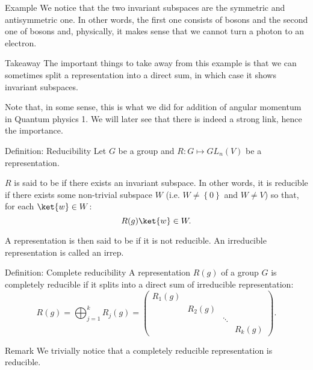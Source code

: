 \documentclass[a4paper]{article}
\begin{document}
\begin{parag}{Example}
    We notice that the two invariant subspaces are the symmetric and antisymmetric one. In other words, the first one consists of bosons and the second one of bosons and, physically, it makes sense that we cannot turn a photon to an electron.

    \begin{subparag}{Takeaway}
        The important things to take away from this example is that we can sometimes split a representation into a direct sum, in which case it shows invariant subspaces.

        Note that, in some sense, this is what we did for addition of angular momentum in Quantum physics 1. We will later see that there is indeed a strong link, hence the importance.
    \end{subparag}
\end{parag}

\begin{parag}{Definition: Reducibility}
    Let $G$ be a group and $R: G \mapsto GL_n\left(V\right)$ be a representation.

    $R$ is said to be  if there exists an invariant subspace. In other words, it is reducible if there exists some non-trivial subspace $W$ (i.e. $W \neq \left\{0\right\}$ and $W \neq V$) so that, for each $\ket{w} \in W$: 
    \[R\left(g\right) \ket{w} \in W.\]

    A representation is then said to be  if it is not reducible. An irreducible representation is called an irrep.
\end{parag}

\begin{parag}{Definition: Complete reducibility}
    A representation $R\left(g\right)$ of a group $G$ is completely reducible if it splits into a direct sum of irreducible representation: 
    \[R\left(g\right) = \bigoplus_{j=1}^{k} R_j\left(g\right) = \begin{pmatrix} R_1\left(g\right) &  &  &  \\  & R_2\left(g\right) &  &  \\  &  & \ddots &  \\  &  &  & R_k\left(g\right) \end{pmatrix}.\]

    \begin{subparag}{Remark}
        We trivially notice that a completely reducible representation is reducible.
    \end{subparag}
\end{parag}
\end{document}
